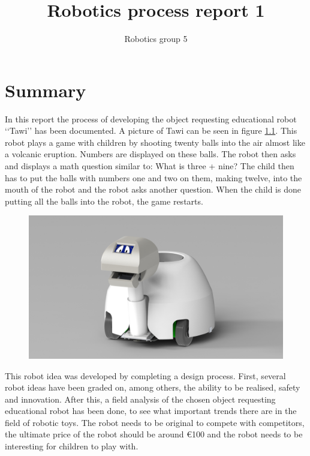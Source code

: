 \documentclass[11pt,twoside,a4paper]{report}
\begin{document}
\title{Robotics process report 1}
\author{Robotics group 5}

\tableofcontents

\chapter{Summary}
In this report the process of developing the object requesting educational robot \lq\lq{}Tawi\rq\rq{} has been documented. A picture of Tawi can be seen in figure \ref{fig:summRender}. This robot plays a game with children by shooting twenty balls into the air almost like a volcanic eruption. Numbers are displayed on these balls. The robot then asks and displays a math question similar to: What is three + nine? The child then has to put the balls with numbers one and two on them, making twelve, into the mouth of the robot and the robot asks another question. When the child is done putting all the balls into the robot, the game restarts. \\
 
\begin{figure}[H]
\begin{center}
\includegraphics[width=14cm]{Images/RenderAnne1.JPG}
\caption{ }
\label{fig:summRender}
\end{center}
\end{figure}
 
This robot idea was developed by completing a design process. First, several robot ideas have been graded on, among others, the ability to be realised, safety and innovation.  After this, a field analysis of the chosen object requesting educational robot has been done, to see what important trends there are in the field of robotic toys. The robot needs to be original to compete with competitors, the ultimate price of the robot should be around €100 and the robot needs to be interesting for children to play with.     \\
\\
\end{document}
